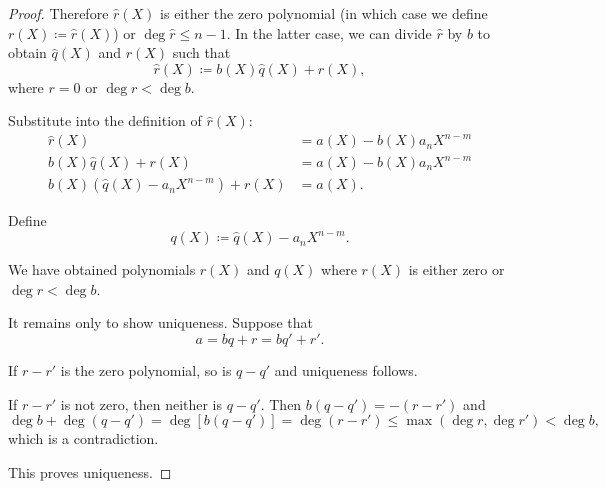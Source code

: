 \begin{proof}
  Therefore \( \hat r(X) \) is either the zero polynomial (in which case we define \( r(X) \coloneqq \hat r(X) \)) or \( \deg \hat r \leq n - 1 \). In the latter case, we can divide \( \hat r \) by \( b \) to obtain \( \hat q(X) \) and \( r(X) \) such that
  \begin{equation*}
    \hat r(X) \coloneqq b(X) \hat q(X) + r(X),
  \end{equation*}
  where \( r = 0 \) or \( \deg r < \deg b \).

  Substitute into the definition of \( \hat r(X) \):
  \begin{align*}
    \hat r(X) &= a(X) - b(X) a_n X^{n-m} \\
    b(X) \hat q(X) + r(X) &= a(X) - b(X) a_n X^{n-m} \\
    b(X) \left(\hat q(X) - a_n X^{n-m} \right) + r(X) &= a(X).
  \end{align*}

  Define
  \begin{equation*}
    q(X) \coloneqq \hat q(X) - a_n X^{n-m}.
  \end{equation*}

  We have obtained polynomials \( r(X) \) and \( q(X) \) where \( r(X) \) is either zero or \( \deg r < \deg b \).

  It remains only to show uniqueness. Suppose that
  \begin{equation*}
    a = bq + r = bq' + r'.
  \end{equation*}

  If \( r - r' \) is the zero polynomial, so is \( q - q' \) and uniqueness follows.

  If \( r - r' \) is not zero, then neither is \( q - q' \). Then \( b(q - q') = -(r - r') \) and
  \begin{equation*}
    \deg b + \deg(q - q') = \deg[b (q - q')] = \deg(r - r') \leq \max(\deg r, \deg r') < \deg b,
  \end{equation*}
  which is a contradiction.

  This proves uniqueness.
\end{proof}

